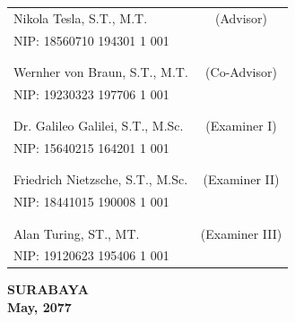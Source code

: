     \noindent
    \begin{tabularx}{\textwidth}{X c}
      Nikola Tesla, S.T., M.T.          & (Advisor) \\
      NIP: 18560710 194301 1 001        & \\
      &  \\
      &  \\
      Wernher von Braun, S.T., M.T.     & (Co-Advisor) \\
      NIP: 19230323 197706 1 001        & \\
      &  \\
      &  \\
      Dr. Galileo Galilei, S.T., M.Sc.  & (Examiner I) \\
      NIP: 15640215 164201 1 001        & \\
      &  \\
      &  \\
      Friedrich Nietzsche, S.T., M.Sc.  & (Examiner II) \\
      NIP: 18441015 190008 1 001        & \\
      &  \\
      &  \\
      Alan Turing, ST., MT.             & (Examiner III) \\
      NIP: 19120623 195406 1 001        & \\
    \end{tabularx}
  \endgroup

  \vspace{4ex}

  \begin{center}
    \textbf{SURABAYA} \\
    \textbf{May, 2077}
  \end{center}
\endgroup
